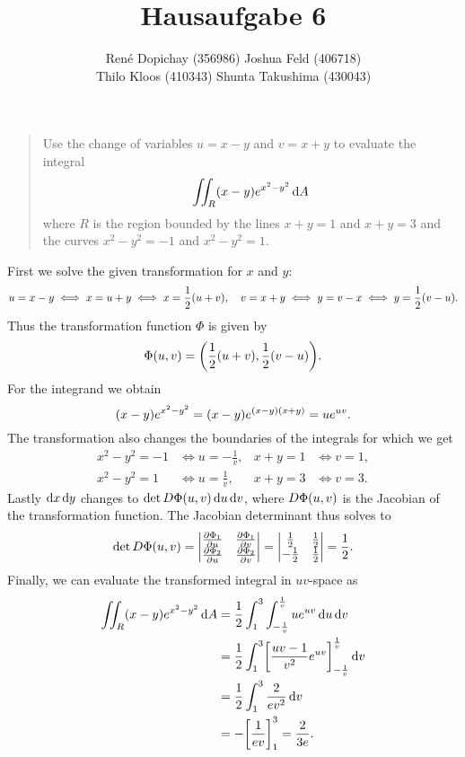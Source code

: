 \documentclass{exercise}
\title{Hausaufgabe 6}
\author{René Dopichay (356986) \quad Joshua Feld (406718)\\Thilo Kloos (410343) \quad Shunta Takushima (430043)}
\begin{document}
	\maketitle


	\section{}

	\begin{quote}
		Use the change of variables \(u = x - y\) and \(v = x + y\) to evaluate the integral
		\begin{equation}
			\iint_R \parentheses*{x - y}e^{x^2 - y^2}\d A
		\end{equation}
		where \(R\) is the region bounded by the lines \(x + y = 1\) and \(x + y = 3\) and the curves \(x^2 - y^2 = -1\) and \(x^2 - y^2 = 1\).
	\end{quote}

	First we solve the given transformation for \(x\) and \(y\):
	\[
		u = x - y \iff x = u + y \iff x = \frac{1}{2}\parentheses*{u + v}, \quad v = x + y \iff y = v - x \iff y = \frac{1}{2}\parentheses*{v - u}.
	\]
	Thus the transformation function \(\Phi\) is given by
	\[
		\Phi\parentheses*{u, v} = \parentheses*{\frac{1}{2}\parentheses*{u + v}, \frac{1}{2}\parentheses*{v - u}}.
	\]
	For the integrand we obtain
	\[
		\parentheses*{x - y}e^{x^2 - y^2} = \parentheses*{x - y}e^{\parentheses*{x - y}\parentheses*{x + y}} = ue^{uv}.
	\]
	The transformation also changes the boundaries of the integrals for which we get
	\begin{align*}
		x^2 - y^2 = -1 &\iff u = -\frac{1}{v}, & x + y = 1 &\iff v = 1,\\
		x^2 - y^2 = 1 &\iff u = \frac{1}{v}, & x + y = 3 &\iff v = 3.
	\end{align*}
	Lastly \(\mathop{\mathrm{d}\!} x\mathop{\mathrm{d}\!} y\) changes to \(\det D\Phi\parentheses*{u, v}\d u\d v\), where \(D\Phi\parentheses*{u, v}\) is the Jacobian of the transformation function.
	The Jacobian determinant thus solves to
	\[
		\det D\Phi\parentheses*{u, v} = \begin{vmatrix}
			\frac{\partial\Phi_1}{\partial u} & \frac{\partial\Phi_1}{\partial v}\\
			\frac{\partial\Phi_2}{\partial u} & \frac{\partial\Phi_2}{\partial v}
		\end{vmatrix} = \begin{vmatrix}
			\frac{1}{2} & \frac{1}{2}\\
			-\frac{1}{2} & \frac{1}{2}
		\end{vmatrix} = \frac{1}{2}.
	\]
	Finally, we can evaluate the transformed integral in \(uv\)-space as
	\begin{align*}
		\iint_R \parentheses*{x - y}e^{x^2 - y^2}\d A &= \frac{1}{2}\int_1^3 \int_{-\frac{1}{v}}^{\frac{1}{v}} ue^{uv}\d u\d v\\
		&= \frac{1}{2}\int_1^3 \brackets*{\frac{uv - 1}{v^2}e^{uv}}_{-\frac{1}{v}}^{\frac{1}{v}}\d v\\
		&= \frac{1}{2}\int_1^3 \frac{2}{ev^2}\d v\\
		&= -\brackets*{\frac{1}{ev}}_1^3 = \frac{2}{3e}.
	\end{align*}
\end{document}
